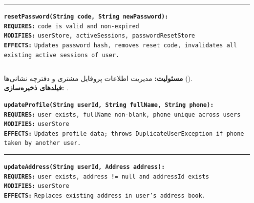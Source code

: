 \documentclass[11pt,a4paper]{article}
\begin{document}
\begin{contractbox}
\begin{latin}
\vspace{4pt}\hrule\vspace{4pt}

\textbf{\color{autnavy}\texttt{resetPassword(String code, String newPassword):}} \\
\hspace*{1.5em}\textbf{\color{darkred}\texttt{REQUIRES:}} \texttt{code is valid and non-expired} \\
\hspace*{1.5em}\textbf{\color{autblue}\texttt{MODIFIES:}} \texttt{userStore, activeSessions, passwordResetStore} \\
\hspace*{1.5em}\textbf{\color{autteal}\texttt{EFFECTS:}}  \texttt{Updates password hash, removes reset code, invalidates all existing active sessions of user.}
\end{latin}
\end{contractbox}

\subsection{}
\textbf{مسئولیت:} مدیریت اطلاعات پروفایل مشتری و دفترچه نشانی‌ها ().\\
\textbf{فیلدهای ذخیره‌سازی:} .\\
\begin{contractbox}
\begin{latin}
\setlength{\parindent}{0pt}
\setlength{\parskip}{2pt}
\small
\textbf{\color{autnavy}\texttt{updateProfile(String userId, String fullName, String phone):}} \\
\hspace*{1.5em}\textbf{\color{darkred}\texttt{REQUIRES:}} \texttt{user exists, fullName non-blank, phone unique across users} \\
\hspace*{1.5em}\textbf{\color{autblue}\texttt{MODIFIES:}} \texttt{userStore} \\
\hspace*{1.5em}\textbf{\color{autteal}\texttt{EFFECTS:}}  \texttt{Updates profile data; throws DuplicateUserException if phone taken by another user.}

\vspace{4pt}\hrule\vspace{4pt}

\textbf{\color{autnavy}\texttt{updateAddress(String userId, Address address):}} \\
\hspace*{1.5em}\textbf{\color{darkred}\texttt{REQUIRES:}} \texttt{user exists, address != null and addressId exists} \\
\hspace*{1.5em}\textbf{\color{autblue}\texttt{MODIFIES:}} \texttt{userStore} \\
\hspace*{1.5em}\textbf{\color{autteal}\texttt{EFFECTS:}}  \texttt{Replaces existing address in user's address book.}
\end{latin}
\end{contractbox}
\end{document}
